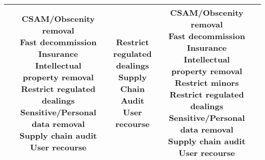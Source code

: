 \documentclass[fleqn]{article}
\begin{document}
\begin{landscape}
\begin{table}[H]
\begin{tabular}{|c|c|c|c|c|}
{		}
		& \makecell[l]{
			\textbullet\hspace{3pt} CSAM/Obscenity removal \\ 	
			\textbullet\hspace{3pt} Fast decommission \\ 	
			\textbullet\hspace{3pt} Insurance \\ 	
			\textbullet\hspace{3pt} Intellectual property removal \\ 	
			\textbullet\hspace{3pt} Restrict regulated dealings \\ 	
			\textbullet\hspace{3pt} Sensitive/Personal data removal \\ 	
			\textbullet\hspace{3pt} Supply chain audit \\ 	
			\textbullet\hspace{3pt} User recourse \\   
		}
		& \makecell[l]{	
			\textbullet\hspace{3pt} Restrict regulated dealings \\ 		
			\textbullet\hspace{3pt} Supply Chain Audit \\ 	
			\textbullet\hspace{3pt} User recourse \\  
		}
		& \makecell[l]{
			\textbullet\hspace{3pt} CSAM/Obscenity removal \\ 	
			\textbullet\hspace{3pt} Fast decommission \\ 	
			\textbullet\hspace{3pt} Insurance \\ 	
			\textbullet\hspace{3pt} Intellectual property removal \\ 		
			\textbullet\hspace{3pt} Restrict minors \\ 	
			\textbullet\hspace{3pt} Restrict regulated dealings \\ 	
			\textbullet\hspace{3pt} Sensitive/Personal data removal \\ 	
			\textbullet\hspace{3pt} Supply chain audit \\ 	
			\textbullet\hspace{3pt} User recourse \\   		 
		}
		\\
		\hline
	\end{tabular}
	\label{table:high_risk_plan_by_tc}
\end{table}


\end{landscape}
\end{document}
